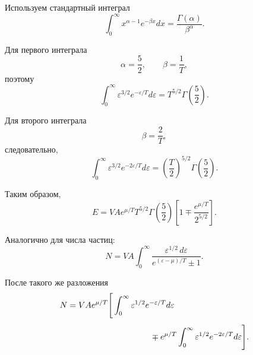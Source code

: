 \documentclass[../final.tex]{subfiles}
\begin{document}
Используем стандартный интеграл
%
\begin{equation*}
    \int_0^\infty
    x^{\alpha-1}
    e^{-\beta x}
    dx
    =
    \frac{
        \Gamma(\alpha)
    }{
        \beta^\alpha
    }.
\end{equation*}

Для первого интеграла
%
\begin{equation*}
    \alpha
    =
    \frac{5}{2},
    \qquad
    \beta
    =
    \frac{1}{T},
\end{equation*}
%
поэтому
%
\begin{equation*}
    \int_0^\infty
    \varepsilon^{3/2}
    e^{-\varepsilon/T}
    d\varepsilon
    =
    T^{5/2}
    \Gamma
    \left(
        \frac{5}{2}
    \right).
\end{equation*}

Для второго интеграла
%
\begin{equation*}
    \beta
    =
    \frac{2}{T},
\end{equation*}
%
следовательно,
%
\begin{equation*}
    \int_0^\infty
    \varepsilon^{3/2}
    e^{-2\varepsilon/T}
    d\varepsilon
    =
    \left(
        \frac{T}{2}
    \right)^{5/2}
    \Gamma
    \left(
        \frac{5}{2}
    \right).
\end{equation*}

Таким образом,
%
\[
    \boxed{
        E
        =
        VAe^{\mu/T}
        T^{5/2}
        \Gamma
        \left(
            \frac{5}{2}
        \right)
        \left[
            1
            \mp
            \frac{
                e^{\mu/T}
            }{
                2^{5/2}
            }
        \right]
    }.
\]

Аналогично для числа частиц:
%
\begin{equation*}
    N
    =
    VA
    \int_0^\infty
    \frac{
        \varepsilon^{1/2}\,
        d\varepsilon
    }{
        e^{(\varepsilon-\mu)/T}\pm1
    }.
\end{equation*}

После такого же разложения
%
\begin{align*}
    N
    &=
    VAe^{\mu/T}
    \Bigg[
        \int_0^\infty
        \varepsilon^{1/2}
        e^{-\varepsilon/T}
        d\varepsilon
        \\[4pt]
        &\hspace{3.5cm}
        \mp
        e^{\mu/T}
        \int_0^\infty
        \varepsilon^{1/2}
        e^{-2\varepsilon/T}
        d\varepsilon
    \Bigg].
\end{align*}
\end{document}
